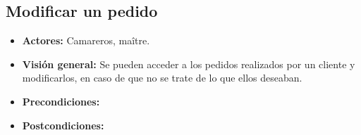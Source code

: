 \documentclass[spanish,a4paper,11pt, twoside]{report}	%
\begin{document}
		
	\subsection{Modificar un pedido}
			\begin{itemize}
			\item \textbf{Actores:} Camareros, maître.
			\item \textbf{Visión general:} Se pueden acceder a los pedidos realizados por un cliente y modificarlos, en caso de que no se trate de lo que ellos deseaban.
			\item \textbf{Precondiciones:} 
			\item \textbf{Postcondiciones:} 
		\end {itemize}


\end{document}
